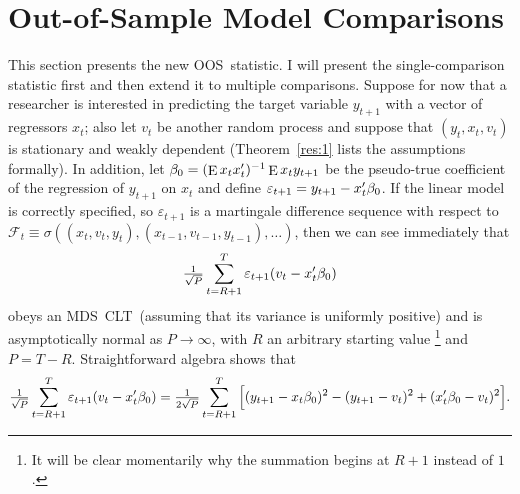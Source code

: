 \documentclass[12pt,fleqn]{article}
\theoremstyle{definition}
\DeclareMathOperator{\E}{E}
\newcommand{\btrue}[1][]{\if#1*\hat\beta_{T+1}\else\beta_0\fi}
\newcommand{\osum}[1]{\sum_{#1=R+1}^T}
\newcommand{\oclt}[1]{\tfrac{1}{\sqrt{P}} \osum{#1}}
\newcommand{\clt}{CLT}
\newcommand{\mds}{MDS}
\newcommand{\oos}{OOS}
\begin{document}
\section{Out-of-Sample Model Comparisons}\label{sec:1}
This section presents the new \oos\ statistic.  I will present the
single-comparison statistic first and then extend it to multiple
comparisons.  Suppose for now that a researcher is interested in
predicting the target variable $y_{t+1}$ with a vector of regressors
$x_t$; also let $v_t$ be another random process and suppose that
$(y_t, x_t, v_t)$ is stationary and weakly dependent
(Theorem~\ref{res:1} lists the assumptions formally).  In addition,
let $\btrue = (\E x_t x_t')^{-1} \E x_t y_{t+1}$ be the pseudo-true
coefficient of the regression of $y_{t+1}$ on $x_t$ and define
$\varepsilon_{t+1} = y_{t+1} - x_t'\btrue$.  If the linear model is
correctly specified, so $\varepsilon_{t+1}$ is a martingale difference
sequence with respect to $\mathcal{F}_t \equiv \sigma((x_t, v_t, y_t),
(x_{t-1}, v_{t-1}, y_{t-1}),\dots)$, then we can see immediately that
\begin{equation}
  \label{eq:4}
  \oclt{t} \varepsilon_{t+1} (v_t - x_t'\btrue)
\end{equation}
obeys an \mds\ \clt\ (assuming that its variance is uniformly
positive) and is asymptotically normal as $P \to \infty$, with $R$ an
arbitrary starting value%
\footnote{It will be clear momentarily why the
  summation begins at $R+1$ instead of $1$.} %
and $P = T - R$.
Straightforward algebra \citep{ClW:07} shows that
\begin{equation}
  \label{eq:5}
  \tfrac{1}{\sqrt{P}} \osum{t} \varepsilon_{t+1} (v_t -
  x_t'\btrue) = \tfrac{1}{2 \sqrt{P}} \osum{t} \Big[(y_{t+1} -
  x_t\btrue)^2 - (y_{t+1} - v_t)^2 + (x_t'\btrue - v_t)^2 \Big].
\end{equation}
\end{document}
